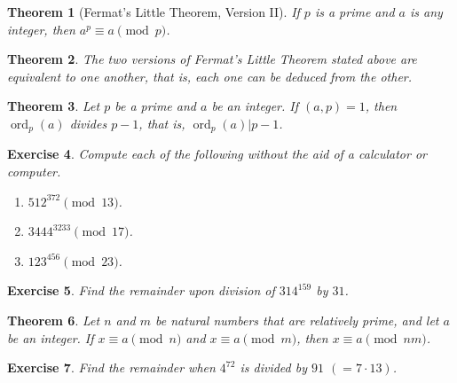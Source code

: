 \documentclass[11pt,leqno]{article}
\newtheorem{thm}{Theorem}[section]
\newtheorem{exer}[thm]{Exercise}
\theoremstyle{definition}
\begin{document}
\begin{thm}[Fermat's Little Theorem, Version II]
If $p$ is a prime and $a$ is \emph{any} integer, then $a^p \equiv a
\pmod{p}$.
\end{thm}

\begin{thm}
The two versions of  Fermat's Little Theorem stated above are
equivalent to one another, that is, each one can be deduced from the
other.
\end{thm}

\begin{thm}
Let $p$ be a prime and $a$ be an integer. If $(a,p)=1$, then
$\operatorname{ord}_p(a)$ divides $p-1$, that is,
$\operatorname{ord}_p(a)| p-1$.
\end{thm}

\begin{exer}
Compute each of the following without the aid of a calculator or
computer.
\begin{enumerate}
\item $512^{372} \pmod{13}$.
\item $3444^{3233} \pmod{17}$.
\item $123^{456} \pmod{23}$.
\end{enumerate}
\end{exer}

\begin{exer}
Find the remainder upon division of $314^{159}$ by $31$.
\end{exer}

\begin{thm}
Let $n$ and $m$ be natural numbers that are relatively prime, and
let $a$ be an integer.  If $x \equiv a \pmod{n}$ and $x \equiv a
\pmod{m}$, then $x \equiv a \pmod{nm}$.
\end{thm}


\begin{exer}
Find the remainder when $4^{72}$ is divided by $91$ $(=7\cdot 13)$.
\end{exer}
\end{document}
